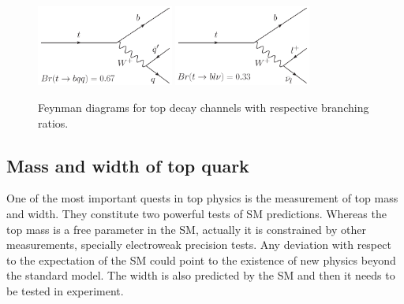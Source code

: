 \begin{figure}[!Hhtbp]
  \begin{center}
    \includegraphics[width=0.4\textwidth]{figs/Top_H_Decay.png}
    \includegraphics[width=0.4\textwidth]{figs/Top_L_Decay.png}
    \caption{Feynman diagrams for top decay channels with respective branching ratios.}
    \label{fig:BRratiosandDecayChannels}
  \end{center}
\end{figure}

%
%
%
%
%
%

\subsection{Mass and width of top quark}

One of the most important quests in top physics is the measurement of top mass and width. They constitute two powerful tests of SM predictions. Whereas the top mass is a free parameter in the SM, actually it is constrained by other measurements, specially electroweak precision tests. Any deviation with respect to the expectation of the SM could point to the existence of new physics beyond the standard model. The width is also predicted by the SM and then it needs to be tested in experiment. 

